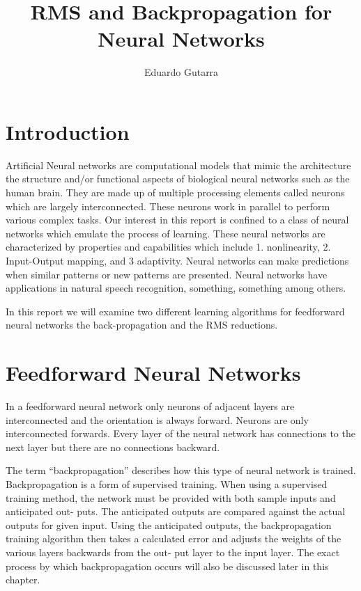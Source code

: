 \documentclass[11pt]{article}
\title{RMS and Backpropagation for Neural Networks}
\author{Eduardo Gutarra}
\begin{document}
	
\ifpdf
{}
\else
{}
\fi
	
\maketitle
	
\section{Introduction} %
\label{sec:introduction}

Artificial Neural networks are computational models that mimic the architecture the structure and/or functional aspects of biological
neural networks such as the human brain. They are made up of multiple processing elements called neurons which are largely
interconnected. These neurons work in parallel to perform various complex tasks. Our interest in this report is confined to a class of
neural networks which emulate the process of learning. These neural networks are characterized by properties and capabilities which
include 1. nonlinearity, 2. Input-Output mapping, and 3 adaptivity. Neural networks can make predictions when similar patterns or new
patterns are presented. Neural networks have applications in natural speech recognition, something, something among others.

In this report we will examine two different learning algorithms for feedforward neural networks the back-propagation and the RMS
reductions.

\section{Feedforward Neural Networks} %
\label{sec:feedforward_neural_networks}

In a feedforward neural network only neurons of adjacent layers are interconnected and the orientation is always forward. Neurons are
only interconnected forwards. Every layer of the neural network has connections to the next layer but there are no connections
backward.



The term “backpropagation” describes how this type of neural network is trained. Backpropagation is a form of supervised training. When
using a supervised training method, the network must be provided with both sample inputs and anticipated out- puts. The anticipated
outputs are compared against the actual outputs for given input. Using the anticipated outputs, the backpropagation training algorithm
then takes a calculated error and adjusts the weights of the various layers backwards from the out- put layer to the input layer. The
exact process by which backpropagation occurs will also be discussed later in this chapter.
\end{document}
